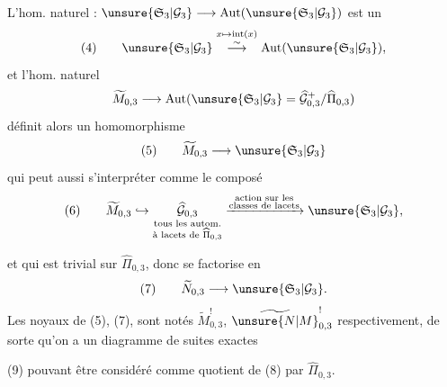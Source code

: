 L'hom. naturel : $\unsure{\mathfrak S_3|\mathcal G_3}\longrightarrow\operatorname{Aut}(\unsure{\mathfrak S_3|\mathcal G_3})$ est un 
\[
(4)\qquad\unsure{\mathfrak S_3|\mathcal G_3}\overset{x\mapsto\operatorname{int}(x)}{\overset{\sim}{\longrightarrow}}\operatorname{Aut}(\unsure{\mathfrak S_3|\mathcal G_3}),
\]
et l'hom. naturel
\[
\widetilde M_{0,3}\longrightarrow\operatorname{Aut}(\unsure{\mathfrak S_3|\mathcal G_3}=\widehat{\mathcal G}_{0,3}^{+}/\widehat{\Pi}_{0,3})
\]
définit alors un homomorphisme
\[
(5)\qquad\widetilde M_{0,3}\longrightarrow\unsure{\mathfrak S_3|\mathcal G_3}
\]
qui peut aussi s'interpréter comme le composé
\[
(6)\qquad\widetilde M_{0,3}\hookrightarrow
\underset{\substack{\text{tous les autom.}\\\text{à lacets de }\widehat{\Pi}_{0,3}}}{\widehat{\mathcal G}_{0,3}}
\xrightarrow{\substack{\text{action sur les}\\\text{classes de lacets}}}
\unsure{\mathfrak S_3|\mathcal G_3},
\]


et qui est trivial sur $\widehat{\Pi}_{0,3}$, donc se factorise en
\[
(7)\qquad\widetilde N_{0,3}\longrightarrow\unsure{\mathfrak S_3|\mathcal G_3}.
\]
Les noyaux de (5), (7), sont notés $\widetilde M_{0,3}^{!}$, $\widetilde{\unsure{N|M}}_{0,3}^{!}$ respectivement, de sorte qu'on a un diagramme de suites exactes


(9) pouvant être considéré comme quotient de (8) par $\widehat{\Pi}_{0,3}$.


